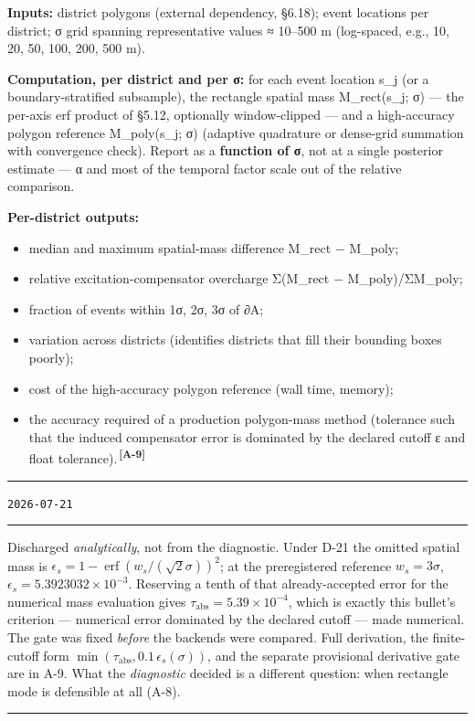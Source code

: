 \documentclass[
  10pt,
]{article}
\providecommand{\tightlist}{%
  \setlength{\itemsep}{0pt}\setlength{\parskip}{0pt}}
\newcommand{\amdref}[1]{{\color{amdcolor}\textsuperscript{\,\textbf{[#1]}}}}
\newenvironment{amendment}[2]{%
  \par\medskip\noindent
  {\color{amdcolor}\rule{\linewidth}{1pt}}\par\nobreak
  \vspace{-0.45\baselineskip}
  \noindent{\color{amdcolor}\textbf{#1}}\hfill{\color{amdcolor}\small\texttt{#2}}\par\nobreak
  \vspace{-0.35\baselineskip}
  {\color{amdcolor}\rule{\linewidth}{0.4pt}}\par\nobreak\smallskip
}{%
  \par\nobreak\vspace{-0.25\baselineskip}
  {\color{amdcolor}\rule{\linewidth}{1pt}}\par\medskip
}
\begin{document}
\textbf{Inputs:} district polygons (external dependency, §6.18); event locations per district; σ grid spanning representative values ≈ 10--500 m (log-spaced, e.g., 10, 20, 50, 100, 200, 500 m).

\textbf{Computation, per district and per σ:} for each event location s\_j (or a boundary-stratified subsample), the rectangle spatial mass M\_rect(s\_j; σ) --- the per-axis erf product of §5.12, optionally window-clipped --- and a high-accuracy polygon reference M\_poly(s\_j; σ) (adaptive quadrature or dense-grid summation with convergence check). Report as a \textbf{function of σ}, not at a single posterior estimate --- α and most of the temporal factor scale out of the relative comparison.

\textbf{Per-district outputs:}

\begin{itemize}
\tightlist
\item
  median and maximum spatial-mass difference M\_rect − M\_poly;
\item
  relative excitation-compensator overcharge Σ(M\_rect − M\_poly)/ΣM\_poly;
\item
  fraction of events within 1σ, 2σ, 3σ of ∂A;
\item
  variation across districts (identifies districts that fill their bounding boxes poorly);
\item
  cost of the high-accuracy polygon reference (wall time, memory);
\item
  the accuracy required of a production polygon-mass method (tolerance such that the induced compensator error is dominated by the declared cutoff ε and float tolerance).\amdref{A-9}
\end{itemize}

\begin{amendment}{A-9 --- the accuracy target this bullet asks for}{2026-07-21}
Discharged \emph{analytically}, not from the diagnostic. Under D-21 the omitted spatial mass is \(\epsilon_s = 1 - \operatorname{erf}\!\left(w_s / (\sqrt{2}\sigma)\right)^{2}\); at the preregistered reference \(w_s = 3\sigma\), \(\epsilon_s = 5.3923032 \times 10^{-3}\). Reserving a tenth of that already-accepted error for the numerical mass evaluation gives \(\tau_{\mathrm{abs}} = 5.39 \times 10^{-4}\), which is exactly this bullet's criterion --- numerical error dominated by the declared cutoff --- made numerical. The gate was fixed \emph{before} the backends were compared. Full derivation, the finite-cutoff form \(\min(\tau_{\mathrm{abs}}, 0.1\,\epsilon_s(\sigma))\), and the separate provisional derivative gate are in A-9. What the \emph{diagnostic} decided is a different question: when rectangle mode is defensible at all (A-8).
\end{amendment}
\end{document}
